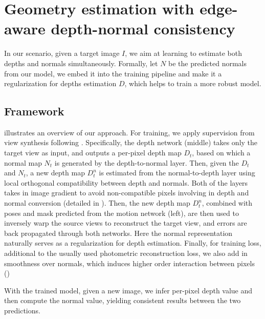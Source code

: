 \vspace{-0\baselineskip}
\section{Geometry estimation with edge-aware depth-normal consistency}
\label{sec:approach}
\vspace{-0\baselineskip}

In our scenario, given a target image $I$, we aim at learning to estimate both depths and normals simultaneously. Formally, let $N$ be the predicted normals from our model, we embed it into the training pipeline and make it a regularization for depths estimation $D$, which helps to train a more robust model.

\vspace{-0\baselineskip}
\subsection{Framework}
\label{sub:framework}
\vspace{-0\baselineskip}

 illustrates an overview of our approach. For training, we apply supervision from view synthesis following \cite{zhou2017unsupervised}. Specifically, the depth network (middle) takes only the target view as input, and
outputs a per-pixel depth map $D_t$, based on which a normal map $N_t$ is generated by the depth-to-normal layer. Then, given the $D_t$ and $N_t$, a new depth map $D_t^n$ is estimated from the normal-to-depth layer using local orthogonal compatibility between depth and normals. Both of the layers takes in image gradient to avoid non-compatible pixels involving in depth and normal conversion (detailed in ).
Then, the new depth map $D_t^n$, combined with poses and mask predicted from the motion network (left), are then used to inversely warp the source views to reconstruct the target view, and errors are back propagated through both networks. Here the normal representation naturally serves as a regularization for depth estimation. Finally, for training loss, additional to the usually used photometric reconstruction loss, we also add in smoothness over normals, which induces higher order interaction between pixels ()

With the trained model, given a new image,  we infer per-pixel depth value and then compute the normal value, yielding consistent results between the two predictions.

